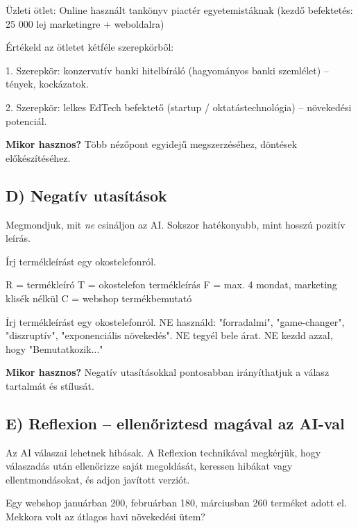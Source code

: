 \documentclass[11pt,a4paper]{article}
\newcommand{\tip}[1]{%
  \vspace{3pt}%
  \begin{tcolorbox}[tipstyle]%
  \textbf{\textcolor{tipborder}{Mikor hasznos?}} #1%
  \end{tcolorbox}\vspace{2pt}}
\begin{document}
\begin{prompt}
Üzleti ötlet: Online használt tankönyv piactér egyetemistáknak  
(kezdő befektetés: 25 000 lej marketingre + weboldalra)

Értékeld az ötletet kétféle szerepkörből:

1. Szerepkör: konzervatív banki hitelbíráló (hagyományos banki szemlélet)
   -- tények, kockázatok.

2. Szerepkör: lelkes EdTech befektető (startup / oktatástechnológia)
   -- növekedési potenciál.
\end{prompt}

\tip{Több nézőpont egyidejű megszerzéséhez, döntések előkészítéséhez.}

\subsection{D) Negatív utasítások}

Megmondjuk, mit \emph{ne} csináljon az AI. Sokszor hatékonyabb, mint hosszú pozitív leírás.

\begin{prompt}
Írj termékleírást egy okostelefonról.
\end{prompt}

\begin{prompt}
R = termékleíró
T = okostelefon termékleírás
F = max. 4 mondat, marketing klisék nélkül
C = webshop termékbemutató

Írj termékleírást egy okostelefonról.
NE használd: "forradalmi", "game-changer", "diszruptív",
             "exponenciális növekedés".
NE tegyél bele árat.
NE kezdd azzal, hogy "Bemutatkozik..."
\end{prompt}

\tip{Negatív utasításokkal pontosabban irányíthatjuk a válasz tartalmát és stílusát.}


\subsection{E) Reflexion -- ellenőriztesd magával az AI-val}

Az AI válaszai lehetnek hibásak. A Reflexion technikával megkérjük, hogy
válaszadás után ellenőrizze saját megoldását, keressen hibákat vagy
ellentmondásokat, és adjon javított verziót.

\begin{prompt}
Egy webshop januárban 200, februárban 180, márciusban 260
terméket adott el. Mekkora volt az átlagos havi növekedési ütem?
\end{prompt}
\end{document}
